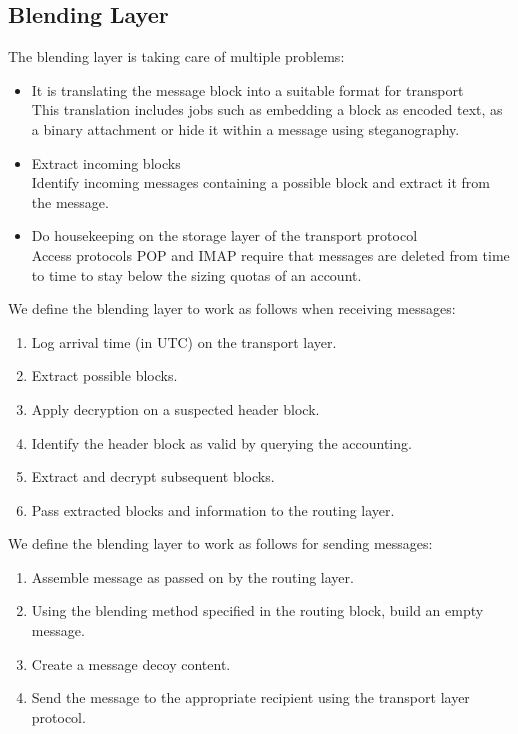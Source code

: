 \subsection{Blending Layer}
The blending layer is taking care of multiple problems:
\begin{itemize}
	\item It is translating the message block into a suitable format for transport\\
	This translation includes jobs such as embedding a block as encoded text, as a binary attachment or hide it within a message using steganography.
	\item Extract incoming blocks\\
	Identify incoming messages containing a possible block and extract it from the message.
	\item Do housekeeping on the storage layer of the transport protocol\\
	Access protocols POP and IMAP require that messages are deleted from time to time to stay below the sizing quotas of an account.      
\end{itemize}

We define the blending layer to work as follows when receiving messages:

\begin{enumerate}
	\item Log arrival time (in UTC) on the transport layer.
	\item Extract possible blocks.
	\item Apply decryption on a suspected header block.
	\item Identify the header block as valid by querying the accounting.
	\item Extract and decrypt subsequent blocks.
	\item Pass extracted blocks and information to the routing layer.
\end{enumerate}

We define the blending layer to work as follows for sending messages:

\begin{enumerate}
	\item Assemble message as passed on by the routing layer.
	\item Using the blending method specified in the routing block, build an empty message. 
	\item Create a message decoy content.
	\item Send the message to the appropriate recipient using the transport layer protocol.
\end{enumerate}

